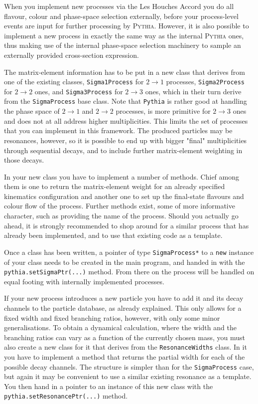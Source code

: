 \documentclass{elsartmod}
\begin{document}
When you implement new processes via the Les Houches Accord you do all 
flavour, colour and phase-space selection externally, before your 
process-level events are input for further processing by \textsc{Pythia}. 
However, it is also possible to implement a new process in exactly the 
same way as the internal \textsc{Pythia} ones, thus making use of the 
internal phase-space selection machinery to sample an externally provided 
cross-section expression.

The matrix-element information has to be put in a new class that derives
from one of the existing classes, \texttt{Sigma1Process} for $2 \to 1$ 
processes, \texttt{Sigma2Process} for $2 \to 2$ ones, and 
\texttt{Sigma3Process} for $2 \to 3$ ones, which in their turn derive 
from the \texttt{SigmaProcess} base class. Note that \texttt{Pythia} is 
rather good at handling the phase space of $2 \to 1$ and $2 \to 2$ 
processes, is more primitive for $2 \to 3$ ones and does not at all address 
higher multiplicities. This limits the set of processes that you can 
implement in this framework. The produced particles may be resonances, 
however, so it is possible to end up with bigger "final" multiplicities 
through sequential decays, and to include further matrix-element weighting 
in those decays.

In your new class you have to implement a number of methods. Chief among 
them is one to return the matrix-element weight for an already specified 
kinematics configuration and another one to set up the final-state flavours 
and colour flow of the process. Further methods exist, some of more 
informative character, such as providing the name of the process. 
Should you actually go ahead, it is strongly recommended to shop around 
for a similar process that has already been implemented, and to use that 
existing code as a template. 

Once a class has been written, a pointer of type \texttt{SigmaProcess*} 
to a \texttt{new} instance of your class needs to be created in the main 
program, and handed in with the \texttt{pythia.setSigmaPtr(...)} method. 
{}From there on the process will be handled on equal footing with internally 
implemented processes.

If your new process introduces a new particle you have to add it and its
decay channels to the particle database, as already explained. This only
allows for a fixed width and fixed branching ratios, however, with only
some minor generalisations. To obtain a dynamical calculation, where the 
width and the branching ratios can vary as a function of the currently 
chosen mass, you must also create a new class for it that derives from the
\texttt{ResonanceWidths} class. In it you have to implement a method
that returns the partial width for each of the possible decay channels.
The structure is simpler than for the \texttt{SigmaProcess} case, but  
again it may be convenient to use a similar existing resonance as a
template. You then hand in a pointer to an instance of this new class 
with the \texttt{pythia.setResonancePtr(...)} method. 
\end{document}
